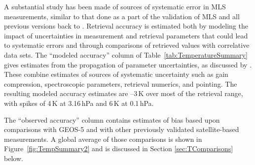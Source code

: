A substantial study has been made of sources of systematic error in MLS \thisv measurements, similar to that done as a part of the validation of MLS \prevv and all previous versions back to \vii.  Retrieval accuracy is estimated both by modeling the impact of uncertainties in measurement and retrieval parameters that could lead to systematic errors and through comparisons of retrieved values with correlative data sets.  The ``modeled accuracy'' column of Table~\ref{tab:TemperatureSummary} gives estimates from the propagation of parameter uncertainties, as discussed by \citet{SchwartzEtal:2008:Validation}. 
%
%
%
%
These combine estimates of
sources of systematic uncertainty such as gain compression, spectroscopic parameters, retrieval numerics, and pointing.
%
The resulting modeled accuracy estimates are --3\,K over most of the retrieval range, with spikes of 4\,K at 3.16\,hPa and 6\,K at 0.1\,hPa.

The ``observed accuracy'' column contains estimates of bias based upon comparisons with \mbox{GEOS-5} and with other previously validated satellite-based measurements. A global average of those comparisons is shown in Figure~\ref{fig:TempSummary2} and is discussed in Section \ref{sec:TComparisons} below. 


